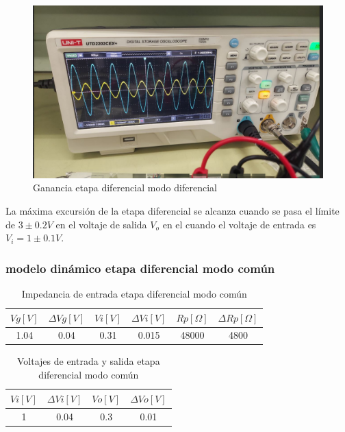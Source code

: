 \begin{figure}[ht]
    \centering
    \includegraphics[width=1.0\textwidth]{src/images/resultados/p2/med-ganancia-mod-diff.png}
    \caption{Ganancia etapa diferencial modo diferencial}
    \label{fig:ganancia-etapa-diff-mod-diff}
    
\end{figure}

La máxima excursión de la etapa diferencial se alcanza cuando se pasa el límite de $3 \pm 0.2 V$ en el voltaje de salida $V_o$ en el cuando el voltaje de entrada es $V_i = 1 \pm 0.1 V$.



\subsubsection{modelo dinámico etapa diferencial modo común}

\begin{table}[h!]
\centering
\begin{tabular}{|c|c|c|c|c|c|}
\hline
\textbf{\(Vg[V]\)} & \textbf{\(\varDelta Vg[V]\)} & \textbf{\(Vi[V]\)} & \textbf{\(\varDelta Vi[V]\)} & \textbf{\(Rp[\Omega]\)} & \textbf{\(\varDelta Rp[\Omega]\)} \\ \hline
1.04 & 0.04 & 0.31 & 0.015 & 48000 & 4800 \\ \hline
\end{tabular}
\caption{Impedancia de entrada etapa diferencial modo común}
\label{tab:med-impedancia-entrada-etapa-diferencial-modo-comun}
\end{table}

\begin{table}[h!] \centering \begin{tabular}{|c|c|c|c|} \hline \textbf{\(Vi[V]\)} & \textbf{\(\varDelta Vi[V]\)} & \textbf{\(Vo[V]\)} & \textbf{\(\varDelta Vo[V]\)} \\ \hline 1 & 0.04 & 0.3 & 0.01 \\ \hline \end{tabular} \caption{Voltajes de entrada y salida etapa diferencial modo común} \label{tab:med-voltajes-entrada-salida-etapa-diferencial-modo-comun} \end{table}

